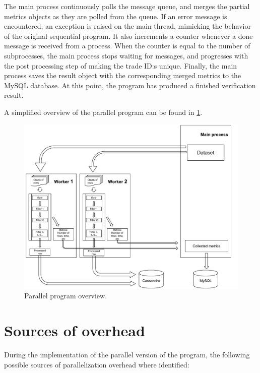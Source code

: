 The main process continuously polls the message queue, and merges the partial metrics objects as they are polled from the queue. If an error message is encountered, an exception is raised on the main thread, mimicking the
behavior of the original sequential program. It also increments a counter whenever a done message is received from a process. When the counter is equal to the number of subprocesses, the main process stops waiting
for messages, and progresses with the post processing step of making the trade ID:s unique. Finally, the main process saves the result object with the corresponding merged metrics to the MySQL database. At this point,
the program has produced a finished verification result.

A simplified overview of the parallel program can be found in \ref{fig:parallel_program_overview}.

\begin{figure}
  \centering
  \includegraphics[width=200mm]{figures/program_overview.pdf}
  \caption[Parallel program overview.]{Parallel program overview.}
  \label{fig:parallel_program_overview}
\end{figure}

\section{Sources of overhead}
During the implementation of the parallel version of the program, the following possible sources of parallelization overhead where identified:

